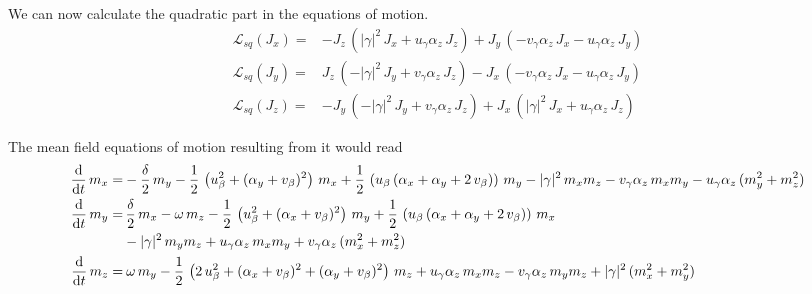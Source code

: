 \documentclass{article}
\begin{document}
We can now calculate the quadratic part in the equations of motion.
\begin{align*}
    \mathcal{L}_{sq}(J_x)=&-J_z\,(|\gamma|^2\,J_x+u_\gamma\alpha_z\,J_z)+J_y\,(-v_\gamma\alpha_z\,J_x - u_\gamma\alpha_z\,J_y)\\
    \mathcal{L}_{sq}(J_y)=&J_z\,(-|\gamma|^2\,J_y+v_\gamma\alpha_z\,J_z)-J_x\,(-v_\gamma\alpha_z\,J_x - u_\gamma\alpha_z\,J_y)\\    
    \mathcal{L}_{sq}(J_z)=&-J_y\,(-|\gamma|^2\,J_y+v_\gamma\alpha_z\,J_z)+J_x\,(|\gamma|^2\,J_x +u_\gamma\alpha_z\,J_z) 
\end{align*}


The mean field equations of motion resulting from it would read
\begin{align*}
   \frac{\text{d}}{\text{d}t}\, {m_x}=&-\frac{\delta}{2}\, {m_y}-\frac{1}{2}\,\left(u_\beta^2+(\alpha_y+v_\beta)^2 \right)\, {m_x} +\frac{1}{2}\,\left( u_\beta\,(\alpha_x+\alpha_y+2\,v_\beta) \right)\, {m_y} -|\gamma|^2\,m_xm_z- v_\gamma\alpha_z\,m_xm_y- u_\gamma\alpha_z\,(m_y^2+m_z^2) \\
\frac{\text{d}}{\text{d}t}\, {m_y}=&\,\frac{\delta}{2}\, {m_x}-\omega\, {m_z}  -\frac{1}{2}\,\left(u_\beta^2+(\alpha_x+v_\beta)^2 \right)\, {m_y}+\frac{1}{2}\,\left( u_\beta\,(\alpha_x+\alpha_y+2\,v_\beta) \right)\, {m_x} \\
&-|\gamma|^2\,m_ym_z+ u_\gamma\alpha_z\,m_xm_y+ v_\gamma\alpha_z\,(m_x^2+m_z^2) \\
\frac{\text{d}}{\text{d}t}\, {m_z}=&\:\omega\, {m_y}-\frac{1}{2}\,\left(2\,u_\beta^2+(\alpha_x+v_\beta)^2+ (\alpha_y+v_\beta)^2 \right)\, {m_z} + u_\gamma\alpha_z\,m_xm_z - v_\gamma\alpha_z\,m_ym_z+ |\gamma|^2\,(m_x^2+m_y^2)
\end{align*}
\end{document}
